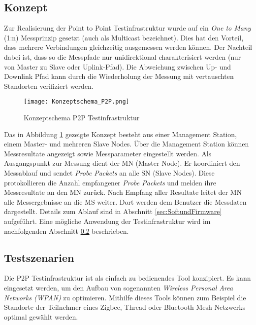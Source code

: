 \subsection{Konzept}\label{sec:KonzeptP2P}
Zur Realisierung der Point to Point Testinfrastruktur wurde auf ein \textit{One to Many} (1:n) Messprinzip gesetzt (auch als Multicast bezeichnet). Dies hat den Vorteil, dass mehrere Verbindungen gleichzeitig ausgemessen werden können. Der Nachteil dabei ist, dass so die Messpfade nur unidirektional charakterisiert werden (nur von Master zu Slave oder Uplink-Pfad). Die Abweichung zwischen Up- und Downlink Pfad kann durch die Wiederholung der Messung mit vertauschten Standorten verifiziert werden. 

\begin{figure} [H]
	\centering
	\texttt{[image: Konzeptschema\_P2P.png]}
	\caption{Konzeptschema P2P Testinfrastruktur}
	\label{fig:KonzeptschemaP2P}
\end{figure}



Das in Abbildung \ref{fig:KonzeptschemaP2P} gezeigte Konzept besteht aus einer Management Station, einem Master- und mehreren Slave Nodes.
Über die Management Station können Messresultate angezeigt sowie Messparameter eingestellt werden. Als Ausgangspunkt zur Messung dient der MN (Master Node).
Er koordiniert den Messablauf und sendet \textit{Probe Packets} an alle SN (Slave Nodes).
Diese protokollieren die Anzahl empfangener \textit{Probe Packets} und melden ihre Messresultate an den MN zurück.
Nach Empfang aller Resultate leitet der MN alle Messergebnisse an die MS weiter.
Dort werden dem Benutzer die Messdaten dargestellt.
Details zum Ablauf sind in Abschnitt \ref{sec:SoftundFirmware} aufgeführt.
Eine mögliche Anwendung der Testinfrastruktur wird im nachfolgenden Abschnitt \ref{sec:TestszenarienP2P} beschrieben.  

\subsection{Testszenarien}\label{sec:TestszenarienP2P}
Die P2P Testinfrastruktur ist als einfach zu bedienendes Tool konzipiert.
Es kann eingesetzt werden, um den Aufbau von sogenannten \textit{Wireless Personal Area Networks (WPAN)} zu optimieren.
Mithilfe dieses Tools können zum Beispiel die Standorte der Teilnehmer eines Zigbee, Thread oder Bluetooth Mesh Netzwerks optimal gewählt werden.

